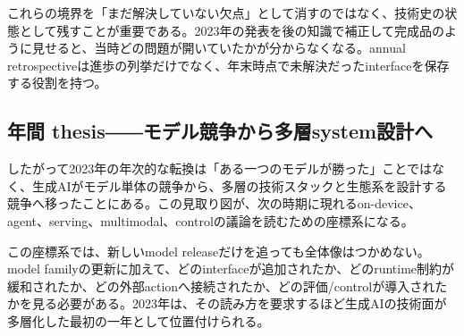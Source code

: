 これらの境界を「まだ解決していない欠点」として消すのではなく、技術史の状態として残すことが重要である。2023年の発表を後の知識で補正して完成品のように見せると、当時どの問題が開いていたかが分からなくなる。annual retrospectiveは進歩の列挙だけでなく、年末時点で未解決だったinterfaceを保存する役割を持つ。


\subsection{年間 thesis――モデル競争から多層system設計へ}

したがって2023年の年次的な転換は「ある一つのモデルが勝った」ことではなく、生成AIがモデル単体の競争から、多層の技術スタックと生態系を設計する競争へ移ったことにある。この見取り図が、次の時期に現れるon-device、agent、serving、multimodal、controlの議論を読むための座標系になる。


この座標系では、新しいmodel releaseだけを追っても全体像はつかめない。model familyの更新に加えて、どのinterfaceが追加されたか、どのruntime制約が緩和されたか、どの外部actionへ接続されたか、どの評価/controlが導入されたかを見る必要がある。2023年は、その読み方を要求するほど生成AIの技術面が多層化した最初の一年として位置付けられる。
